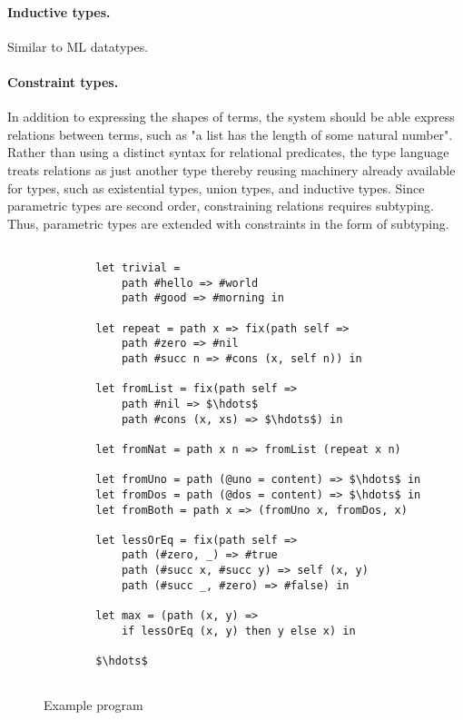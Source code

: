 \documentclass[acmsmall]{acmart}
\theoremstyle{definition}
\begin{document}
\paragraph{Inductive types.} Similar to ML datatypes.

\paragraph{Constraint types.}
In addition to expressing the shapes of terms, the system should be able express relations between terms,
such as "a list has the length of some natural number".
Rather than using a distinct syntax for relational predicates, 
the type language treats relations as just another type thereby reusing machinery already 
available for types, such as existential types, union types, and inductive types.
Since parametric types are second order, constraining relations requires subtyping.
Thus, parametric types are extended with constraints in the form of subtyping.



\begin{figure*}[h]

    \begin{lstlisting}[mathescape=true]

        let trivial =
            path #hello => #world
            path #good => #morning in

        let repeat = path x => fix(path self =>
            path #zero => #nil
            path #succ n => #cons (x, self n)) in

        let fromList = fix(path self =>
            path #nil => $\hdots$
            path #cons (x, xs) => $\hdots$) in

        let fromNat = path x n => fromList (repeat x n)

        let fromUno = path (@uno = content) => $\hdots$ in
        let fromDos = path (@dos = content) => $\hdots$ in
        let fromBoth = path x => (fromUno x, fromDos, x)

        let lessOrEq = fix(path self =>
            path (#zero, _) => #true
            path (#succ x, #succ y) => self (x, y)
            path (#succ _, #zero) => #false) in

        let max = (path (x, y) => 
            if lessOrEq (x, y) then y else x) in

        $\hdots$


    \end{lstlisting}

\caption{Example program}
\label{fig:program}
\end{figure*}
\end{document}

